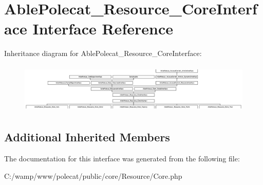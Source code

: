 \hypertarget{interface_able_polecat___resource___core_interface}{}\section{Able\+Polecat\+\_\+\+Resource\+\_\+\+Core\+Interface Interface Reference}
\label{interface_able_polecat___resource___core_interface}
Inheritance diagram for Able\+Polecat\+\_\+\+Resource\+\_\+\+Core\+Interface\+:\begin{figure}[H]
\begin{center}
\leavevmode
\includegraphics[height=2.390244cm]{interface_able_polecat___resource___core_interface}
\end{center}
\end{figure}
\subsection*{Additional Inherited Members}


The documentation for this interface was generated from the following file\+:\begin{DoxyCompactItemize}
\item 
C\+:/wamp/www/polecat/public/core/\+Resource/Core.\+php\end{DoxyCompactItemize}
